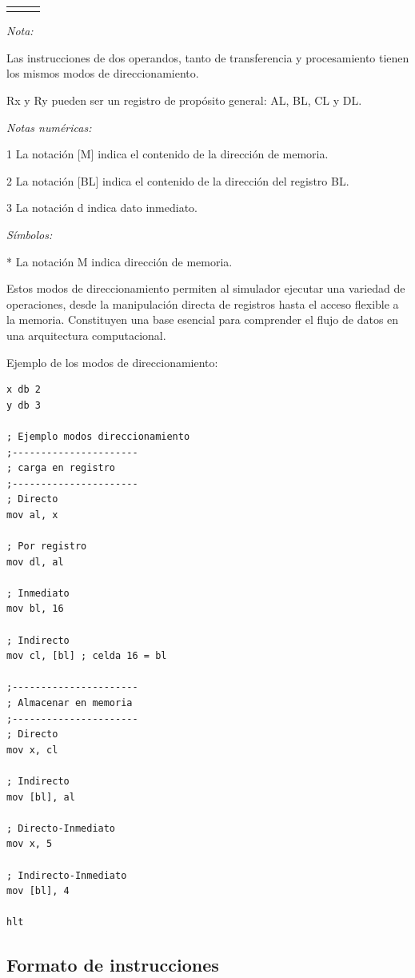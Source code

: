 \documentclass[12pt,oneside]{templates/unerthesis}
\begin{document}
\begin{table}[!h]
{\begin{threeparttable}
\begin{tabular}[t]{>{\raggedright\arraybackslash}p{4cm}|>{\raggedright\arraybackslash}p{5cm}p{8cm}}
\addlinespace[10pt]
\bottomrule
\end{tabular}
\begin{tablenotes}
\item \textit{Nota: } 
\item Las instrucciones de dos operandos, tanto de transferencia y procesamiento tienen los mismos modos de direccionamiento.
\item Rx y Ry pueden ser un registro de propósito general: AL, BL, CL y DL.
\item \textit{Notas numéricas: } 
\item[1] La notación [M] indica el contenido de la dirección de memoria.
\item[2] La notación [BL] indica el contenido de la dirección del registro BL.
\item[3] La notación d indica dato inmediato.
\item \textit{Símbolos: } 
\item[*] La notación M indica dirección de memoria.
\end{tablenotes}
\end{threeparttable}}
\end{table}

Estos modos de direccionamiento permiten al simulador ejecutar una variedad de operaciones, desde la manipulación directa de registros hasta el acceso flexible a la memoria. Constituyen una base esencial para comprender el flujo de datos en una arquitectura computacional.

Ejemplo de los modos de direccionamiento:

\begin{lstlisting}
x db 2 
y db 3

; Ejemplo modos direccionamiento
;----------------------
; carga en registro
;----------------------
; Directo
mov al, x

; Por registro
mov dl, al

; Inmediato
mov bl, 16

; Indirecto
mov cl, [bl] ; celda 16 = bl

;----------------------
; Almacenar en memoria
;----------------------
; Directo
mov x, cl

; Indirecto
mov [bl], al

; Directo-Inmediato
mov x, 5

; Indirecto-Inmediato
mov [bl], 4

hlt\end{lstlisting}

\hypertarget{formato-de-instrucciones}{%
\subsection{Formato de instrucciones}\label{formato-de-instrucciones}}
\end{document}
